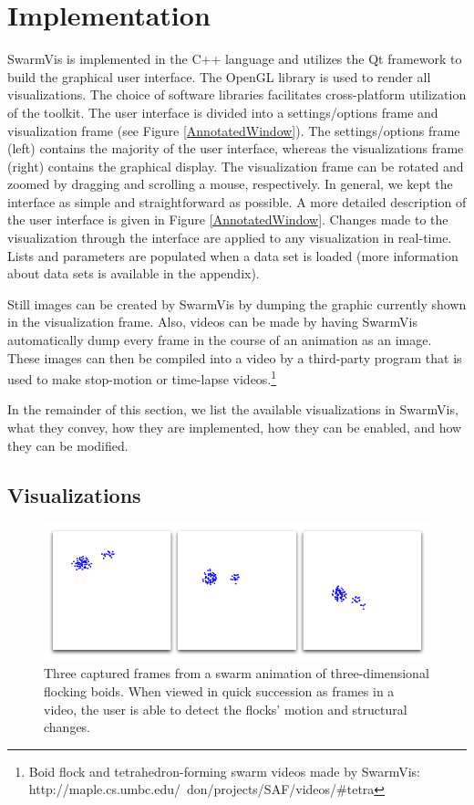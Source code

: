 \documentclass[conference]{IEEEtran}
\begin{document}
\section{Implementation}
SwarmVis is implemented in the C++ language and utilizes the Qt framework\cite{Qt:website}
to build the graphical user interface. The OpenGL library is used to render all visualizations. The choice of software libraries facilitates cross-platform utilization of the toolkit.
The user interface is divided into a settings/options frame and visualization frame (see Figure \ref{AnnotatedWindow}).
The settings/options frame (left) contains the majority of the user interface, whereas the visualizations frame (right) contains  the graphical display.
The visualization frame can be rotated and zoomed by dragging and scrolling a mouse, respectively.
In general, we kept the interface as simple and straightforward as possible.
A more detailed description of the user interface is given in Figure \ref{AnnotatedWindow}.
Changes made to the visualization through the interface are applied to any visualization in real-time.
Lists and parameters are populated when a data set is loaded (more information about data sets is available in the appendix).

Still images can be created by SwarmVis by dumping the graphic currently shown in the visualization frame.
Also, videos can be made by having SwarmVis automatically dump every frame in the course of an animation as an image.
These images can then be compiled into a video by a third-party program that is used to make stop-motion or time-lapse
videos.\footnote{Boid flock and tetrahedron-forming swarm videos made by SwarmVis:\\
 http://maple.cs.umbc.edu/~don/projects/SAF/videos/\#tetra}

In the remainder of this section, we list the available visualizations in SwarmVis, what they convey, how they are implemented,
how they can be enabled, and how they can be modified.


\subsection{Visualizations}\label{visualizations}


\begin{figure}
\centering
\includegraphics[scale=.282]{images/animation.png}
\caption{
Three captured frames from a swarm animation of three-dimensional flocking boids\cite{reynolds1987}.
When viewed in quick succession as frames in a video, the user
is able to detect the flocks' motion and structural changes.}
\label{Animation}
\end{figure}
\end{document}
